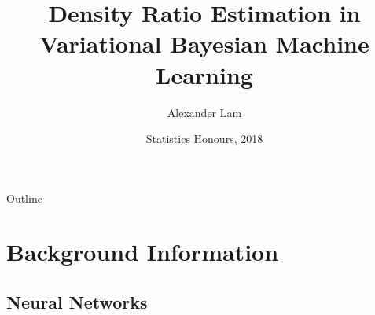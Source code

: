\documentclass[handout]{beamer}
\title{Density Ratio Estimation in Variational Bayesian Machine Learning}
\author{Alexander Lam}
\institute[UNSW] %
{
  Department of Mathematics and Statistics\\
  UNSW
  }
\date{Statistics Honours, 2018}
\begin{document}
\begin{frame}
  \titlepage
\end{frame}

\begin{frame}{Outline}
  \tableofcontents
\end{frame}

\section{Background Information}

\subsection{Neural Networks}
\end{document}
